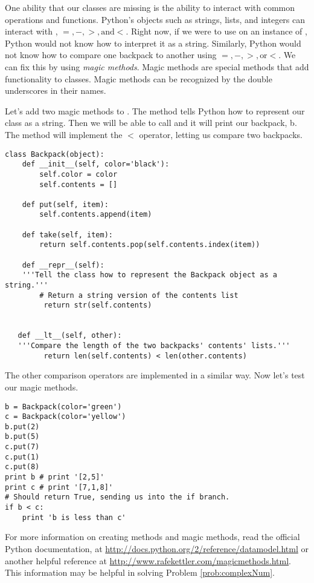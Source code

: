 One ability that our classes are missing is the ability to interact with common operations and functions.
Python's objects such as strings, lists, and integers can interact with ,  $ =, - , >, \text{and} <$.
Right now, if we were to use  on an instance of , Python would not know how to interpret it as a string.
Similarly, Python would not know how to compare one backpack to another using $ =, - , >, \text{or} <$.
We can fix this by using \emph{magic methods}.
Magic methods are special methods that add functionality to classes.
Magic methods can be recognized by the double underscores in their names.

Let's add two magic methods to .
The  method tells Python how to represent our class as a string.
Then we will be able to call  and it will print our backpack, b.
The  method will implement the $<$ operator, letting us compare two backpacks.

\begin{lstlisting}
class Backpack(object):
    def __init__(self, color='black'):
    	self.color = color
    	self.contents = []

    def put(self, item):
    	self.contents.append(item)

    def take(self, item):
    	return self.contents.pop(self.contents.index(item))

    def __repr__(self):
    '''Tell the class how to represent the Backpack object as a string.'''
    	# Return a string version of the contents list
    	 return str(self.contents)


   def __lt__(self, other):
   '''Compare the length of the two backpacks' contents' lists.'''
     	 return len(self.contents) < len(other.contents)

\end{lstlisting}

The other comparison operators are implemented in a similar way.
Now let's test our magic methods.

\begin{lstlisting}
b = Backpack(color='green')
c = Backpack(color='yellow')
b.put(2)
b.put(5)
c.put(7)
c.put(1)
c.put(8)
print b # print '[2,5]'
print c # print '[7,1,8]'
# Should return True, sending us into the if branch.
if b < c:
	print 'b is less than c'

\end{lstlisting}

For more information on creating methods and magic methods, read the official Python documentation, at \url {http://docs.python.org/2/reference/datamodel.html} or another helpful reference at \url{http://www.rafekettler.com/magicmethods.html}.
This information may be helpful in solving Problem \ref{prob:complexNum}.

